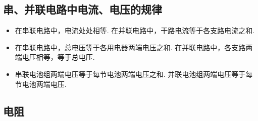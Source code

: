 \subsection{串、并联电路中电流、电压的规律}
\begin{itemize}
\item 在串联电路中，电流处处相等. 在并联电路中，干路电流等于各支路电流之和.
\item 在串联电路中，总电压等于各用电器两端电压之和. 在并联电路中，各支路两端电压相等，等于总电压.
\item 串联电池组两端电压等于每节电池两端电压之和. 并联电池组两端电压等于每节电池两端电压.
\end{itemize}

\subsection{电阻}
